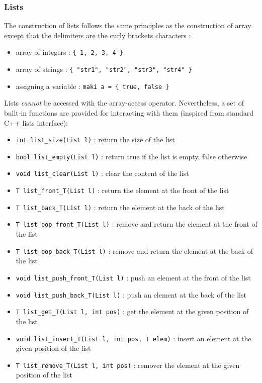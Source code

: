 \documentclass[a4paper,11pt]{article}
\begin{document}
\subsubsection{Lists} 
\label{sssec:lists}
The construction of lists follows the same principles as the construction of array except that the delimiters are the curly brackets characters : 
\begin{itemize}
	\item array of integers : \texttt{\{ 1, 2, 3, 4 \}} 
	\item array of strings : \texttt{\{ "str1", "str2", "str3", "str4" \}} 
	\item assigning a variable : \texttt{maki a = \{ true, false \}}
\end{itemize}
Lists \textit{cannot} be accessed with the array-access operator. Nevertheless, a set of built-in functions are provided for interacting with them (inspired from standard C++ lists interface):
\begin{itemize}
	\item \texttt{int list\_size(List l)} : return the size of the list 
	\item \texttt{bool list\_empty(List l)} : return true if the list is empty, false otherwise
	\item \texttt{void list\_clear(List l)} : clear the content of the list
	\item \texttt{T list\_front\_T(List l)} : return the element at the front of the list
	\item \texttt{T list\_back\_T(List l)} : return the element at the back of the list
	\item \texttt{T list\_pop\_front\_T(List l)} : remove and return the element at the front of the list 
	\item \texttt{T list\_pop\_back\_T(List l)} : remove and return the element at the back of the list
	\item \texttt{void list\_push\_front\_T(List l)} : push an element at the front of the list
	\item \texttt{void list\_push\_back\_T(List l)} : push an element at the back of the list
	\item \texttt{T list\_get\_T(List l, int pos)} : get the element at the given position of the list
	\item \texttt{void list\_insert\_T(List l, int pos, T elem)} : insert an element at the given position of the list
	\item \texttt{T list\_remove\_T(List l, int pos)} : remover the element at the given position of the list
\end{itemize}
\end{document}
